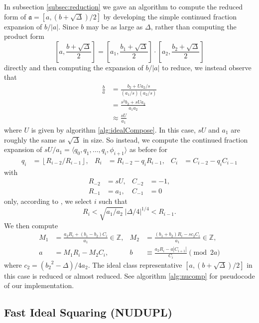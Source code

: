 \documentclass{ucalgthes1}
\theoremstyle{plain}
\theoremstyle{definition}
\newcommand{\ZZ}{\mathbb{Z}}
\newcommand{\floor}[1]{\left\lfloor #1 \right\rfloor}
\begin{document}
In subsection \ref{subsec:reduction} we gave an algorithm to compute the reduced form of \break$\mathfrak a = [a, (b+\sqrt\Delta)/2]$ by developing the simple continued fraction expansion of $b/|a|$.  Since $b$ may be as large as $\Delta$, rather than computing the product form
\[
	\left[a, \frac{b+\sqrt\Delta}{2} \right] = \left[a_1, \frac{b_1+\sqrt\Delta}{2} \right] \cdot \left[a_2, \frac{b_2+\sqrt\Delta}{2} \right]
\]
directly and then computing the expansion of $b/|a|$ to reduce, we instead observe that
\begin{align*}
	\frac{b}{a} &= \frac{b_2 + Ua_2/s}{(a_1/s)(a_2/s)} \\
	&= \frac{s^2 b_2+sUa_2}{a_1a_2} \\
	&\approx \frac{sU}{a_1}
\end{align*}
where $U$ is given by algorithm \ref{alg:idealCompose}.  In this case, $sU$ and $a_1$ are roughly the same as $\sqrt\Delta$ in size.  So instead, we compute the continued fraction expansion of $sU/a_1 = \langle q_0, q_1, \dots, q_i, \phi_{i+1} \rangle$ as before for
\begin{align*}
	q_i &= \floor{R_{i-2} / R_{i-1}}, &
	R_i &= R_{i-2} - q_i R_{i-1}, &
	C_i &= C_{i-2} - q_i C_{i-1}
\end{align*}
with
\begin{align*}
	R_{-2} &= sU,  & C_{-2} &= -1, \\
	R_{-1} &= a_1, & C_{-1} &= 0
\end{align*}
only, according to \cite[Theorem 5.43]{Jac09}, we select $i$ such that
\[
	R_i < \sqrt{a_1/a_2} ~ |\Delta/4|^{1/4} < R_{i-1}.
\]
We then compute
\begin{align*}
	M_1 &= \frac{a_2 R_i + (b_1-b_2)C_i}{a_1}  \in \ZZ, &
	M_2 &= \frac{(b_1+b_2) R_i - s c_2 C_i}{a_1} \in \ZZ, \\
	a &= M_1 R_i - M_2 C_i, &
	b &\equiv \frac{a_2 R_i - a |C_{i+1}|}{C_i} \pmod{2a}
\end{align*}
where $c_2 = ({b_2}^2-\Delta)/4a_2$.  The ideal class representative $[a, (b+\sqrt\Delta)/2]$ in this case is reduced or almost reduced.  See algorithm \ref{alg:nucomp} for pseudocode of our implementation.


\subsection{Fast Ideal Squaring (NUDUPL)}
\end{document}
